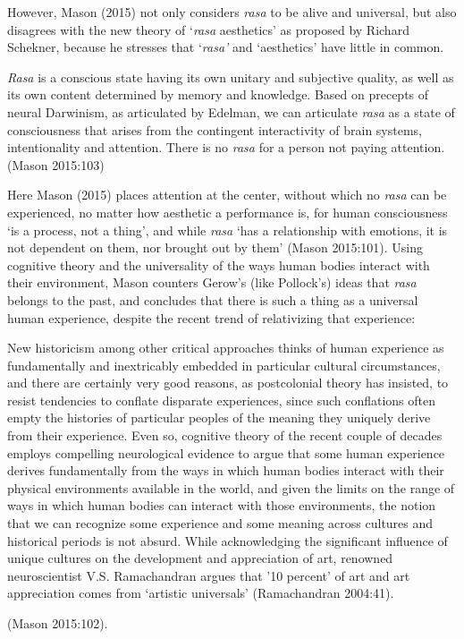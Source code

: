 However, Mason (2015) not only considers \textsl{rasa} to be alive and universal, but also disagrees with the new theory of ‘\textsl{rasa} aesthetics’ as proposed by Richard Schekner, because he stresses that ‘\textsl{rasa’} and ‘aesthetics’ have little in common. 

\begin{myquote}
\textsl{Rasa} is a conscious state having its own unitary and subjective quality, as well as its own content determined by memory and knowledge. Based on precepts of neural Darwinism, as articulated by Edelman, we can articulate \textsl{rasa} as a state of consciousness that arises from the contingent interactivity of brain systems, intentionality and attention. There is no \textsl{rasa} for a person not paying attention.    
\hfill (Mason 2015:103)
\end{myquote}

Here Mason (2015) places attention at the center, without which no \textsl{rasa} can be experienced, no matter how aesthetic a performance is, for human consciousness ‘is a process, not a thing’, and while \textsl{rasa} ‘has a relationship with emotions, it is not dependent on them, nor brought out by them’ (Mason 2015:101). Using cognitive theory and the universality of the ways human bodies interact with their environment, Mason counters Gerow’s (like Pollock’s) ideas that \textsl{rasa} belongs to the past, and concludes that there is such a thing as a universal human experience, despite the recent trend of relativizing that experience:

\begin{myquote}
New historicism among other critical approaches thinks of human experience as fundamentally and inextricably embedded in particular cultural circumstances, and there are certainly very good reasons, as postcolonial theory has insisted, to resist tendencies to conflate disparate experiences, since such conflations often empty the histories of particular peoples of the meaning they uniquely derive from their experience. Even so, cognitive theory of the recent couple of decades employs compelling neurological evidence to argue that some human experience derives fundamentally from the ways in which human bodies interact with their physical environments available in the world, and given the limits on the range of ways in which human bodies can interact with those environments, the notion that we can recognize some experience and some meaning across cultures and historical periods is not absurd. While acknowledging the significant influence of unique cultures on the development and appreciation of art, renowned neuroscientist V.S. Ramachandran argues that ’10 percent’ of art and art appreciation comes from ‘artistic universals’ (Ramachandran 2004:41).  

\hfill(Mason 2015:102). 
\end{myquote}

